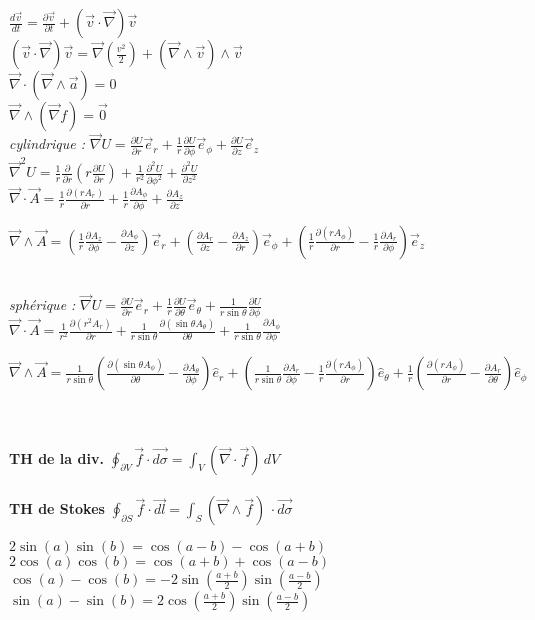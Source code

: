 
$\frac{d\vec{v}}{dt}=\frac{\partial\vec{v}}{\partial t}+(\vec{v} \cdot \vec{\nabla})\vec{v}$
\\
$(\vec{v} \cdot \vec{\nabla})\vec{v}=\vec{\nabla}\left(\frac{v^2}{2}\right)+(\vec \nabla \wedge \vec{v}) \wedge \vec{v}$
\\
$\vec{\nabla}\cdot (\vec{\nabla}\wedge\vec{a})=0$
\\
$\vec{\nabla} \wedge (\vec{\nabla}f)=\vec{0}$
\\
\textit{cylindrique : \:}
$\vec{\nabla}U=\frac{\partial U}{\partial r}\vec{e}_r+\frac{1}{r}\frac{\partial U}{\partial \phi}\vec{e}_{\phi}+\frac{\partial U}{\partial z}\vec{e}_z$
\\
$\vec{\nabla}^2U=\frac{1}{r}\frac{\partial}{\partial r}(r\frac{\partial U}{\partial r})+\frac{1}{r^2}\frac{\partial^2U}{\partial\phi^2}+\frac{\partial^2U}{\partial z^2}$
\\
$\vec{\nabla} \cdot \vec{A}=\frac{1}{r}\frac{\partial(r A_r)}{\partial r} + \frac{1}{r}\frac{\partial A_{\phi}}{\partial \phi}+\frac{\partial A_z}{\partial z}$
\\
\begin{tiny}$\vec{\nabla} \wedge \vec{A}=(\frac{1}{r}\frac{\partial A_z}{\partial\phi}-\frac{\partial A_{\phi}}{\partial z})\vec{e}_r+(\frac{\partial A_r}{\partial z}-\frac{\partial A_z}{\partial r})\vec{e}_{\phi}+(\frac{1}{r}\frac{\partial(r A_{\phi})}{\partial r}-\frac{1}{r}\frac{\partial A_r}{\partial\phi})\vec{e}_z$\end{tiny}
\\
\textit{sphérique : \:}
$\vec{\nabla}U=\frac{\partial U}{\partial r}\vec{e}_r+\frac{1}{r}\frac{\partial U}{\partial\theta}\vec{e}_{\theta}+\frac{1}{r\sin\theta}\frac{\partial U}{\partial \phi}$
\\
$\vec{\nabla} \cdot \vec{A}=\frac{1}{r^2}\frac{\partial (r^2A_r)}{\partial r}+\frac{1}{r\sin\theta}\frac{\partial(\sin\theta A_{\theta})}{\partial\theta}+\frac{1}{r\sin\theta}\frac{\partial A_{\phi}}{\partial\phi}$
\\
\begin{tiny}$\vec{\nabla} \wedge \vec{A} = \frac{1}{r \sin \theta} \left( \frac{\partial (\sin \theta A_{\phi})}{\partial \theta} - \frac{\partial A_{\theta}}{\partial \phi} \right) \hat{e}_r + \left( \frac{1}{r \sin \theta} \frac{\partial A_r}{\partial \phi} - \frac{1}{r} \frac{\partial (r A_{\phi})}{\partial r} \right) \hat{e}_{\theta} + \frac{1}{r} \left( \frac{\partial (r A_{\phi})}{\partial r} - \frac{\partial A_r}{\partial \theta} \right) \hat{e}_{\phi}$\end{tiny}
\\
\\
\textbf{TH de la div.} \quad
$\oint_{\partial V} \! \vec{f} \cdot \vec{d\sigma} = \int_V (\vec{\nabla} \cdot \vec{f}) \, dV$
\\
\\
\textbf{TH de Stokes} \quad
$\oint_{\partial S} \! \vec{f} \cdot \vec{dl} = \int_S (\vec{\nabla} \wedge \vec{f}) \, \cdot \vec{d\sigma}$

 $2\sin(a)\sin(b) = \cos(a-b) - \cos(a+b)$ \\
 $2\cos(a)\cos(b) =  \cos(a+b) + \cos(a-b)$ \\
 $\cos(a) - \cos(b) = -2 \sin\left(\frac{a+b}{2}\right)\sin\left(\frac{a-b}{2}\right)$ \\
 $\sin(a)-\sin(b) =2\cos\left(\frac{a+b}{2}\right)\sin\left(\frac{a-b}{2}\right)$\\

